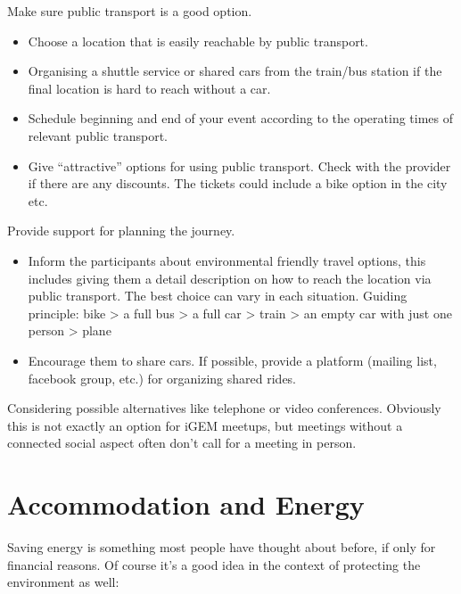 \begin{suggest}{Make sure public transport is a good option.}
	\vspace{-2\topsep}
	\begin{itemize}
		\item Choose a location that is easily reachable by public transport.
		\item Organising a shuttle service or shared cars from the train/bus station if the final location is hard to reach without a car.
		\item Schedule beginning and end of your event according to the operating times of relevant public transport.
		\item Give ``attractive'' options for using public transport. Check with the provider if there are any discounts. The tickets could include a bike option in the city etc.
	\end{itemize}
\end{suggest}
\clearpage
\begin{suggest}{Provide support for planning the journey.}
	\vspace{-2\topsep}
	\begin{itemize}
		\item Inform the participants about environmental friendly travel options, this includes giving them a detail description on how to reach the location via public transport. The best choice can vary in each situation. Guiding principle: bike > a full bus > a full car > train > an empty car with just one person > plane
		\item Encourage them to share cars. If possible, provide a platform (mailing list, facebook group, etc.) for organizing shared rides.
	\end{itemize}	
\end{suggest}

\begin{suggest}{Considering possible alternatives like telephone or video conferences.}
	Obviously this is not exactly an option for iGEM meetups, but meetings without a connected social aspect often don't call for a meeting in person.
\end{suggest}

\section{Accommodation and Energy}

Saving energy is something most people have thought about before, if only for financial reasons. Of course it's a good idea in the context of protecting the environment as well:

